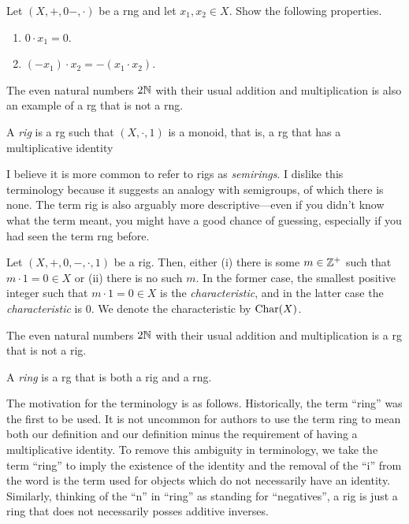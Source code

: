 \begin{exr}\label{exrA.1.43}
Let $(X,+,0-,\cdot )$ be a rng and let $x_1,x_2\in X$.  Show the following properties.
\begin{enumerate}
\item $0\cdot x_1=0$.
\item $(-x_1)\cdot x_2=-(x_1\cdot x_2)$.
\end{enumerate}
\end{exr}
\begin{exm}
The even natural numbers $2\mathbb{N}$ with their usual addition and multiplication is also an example of a rg that is not a rng.
\end{exm}
\begin{dfn}[Rig]\label{dfnA.1.33}
A \emph{rig} is a rg such that $(X,\cdot ,1)$ is a monoid, that is, a rg that has a multiplicative identity
\begin{rmk}
I believe it is more common to refer to rigs as \emph{semirings}.  I dislike this terminology because it suggests an analogy with semigroups, of which there is none.  The term rig is also arguably more descriptive---even if you didn't know what the term meant, you might have a good chance of guessing, especially if you had seen the term rng before.
\end{rmk}
\end{dfn}
\begin{dfn}[Characteristic]
Let $(X,+,0,-,\cdot ,1)$ be a rig.  Then, either (i) there is some $m\in \mathbb{Z} ^+$ such that $m\cdot 1=0\in X$ or (ii) there is no such $m$.  In the former case, the smallest positive integer such that $m\cdot 1=0\in X$ is the \emph{characteristic}, and in the latter case the \emph{characteristic} is $0$.  We denote the characteristic by $\operatorname{Char} (X)$.
\end{dfn}
\begin{exm}
The even natural numbers $2\mathbb{N}$ with their usual addition and multiplication is a rg that is not a rig.
\end{exm}
\begin{dfn}[Ring]
A \emph{ring} is a rg that is both a rig and a rng.
\end{dfn}
\begin{rmk}
The motivation for the terminology is as follows.  Historically, the term ``ring'' was the first to be used.  It is not uncommon for authors to use the term ring to mean both our definition and our definition minus the requirement of having a multiplicative identity.  To remove this ambiguity in terminology, we take the term ``ring'' to imply the existence of the identity and the removal of the ``i'' from the word is the term used for objects which do not necessarily have an identity.  Similarly, thinking of the ``n'' in ``ring'' as standing for ``negatives'', a rig is just a ring that does not necessarily posses additive inverses.
\end{rmk}
